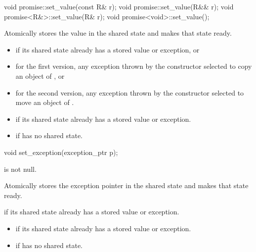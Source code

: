 %
\begin{itemdecl}
void promise::set_value(const R& r);
void promise::set_value(R&& r);
void promise<R&>::set_value(R& r);
void promise<void>::set_value();
\end{itemdecl}

\begin{itemdescr}
\pnum
\effects
Atomically stores the value  in the shared state and
makes that state ready.

\pnum
\throws
\begin{itemize}
\item {} if its shared state
already has a stored value or exception, or
\item for the first version, any exception thrown by the constructor selected to copy an object of , or
\item for the second version, any exception thrown by the constructor selected to move an object of .
\end{itemize}

\pnum
\errors
\begin{itemize}
\item {} if its shared state
already has a stored value or exception.
\item {} if  has no shared state.
\end{itemize}
\end{itemdescr}

%
\begin{itemdecl}
void set_exception(exception_ptr p);
\end{itemdecl}

\begin{itemdescr}
\pnum
\expects
{} is not null.

\pnum
\effects
Atomically stores the exception pointer  in the shared state
and makes that state ready.

\pnum
\throws
{} if its shared state
already has a stored value or exception.

\pnum
\errors
\begin{itemize}
\item {} if its shared state
already has a stored value or exception.
\item {} if  has no shared state.
\end{itemize}
\end{itemdescr}

